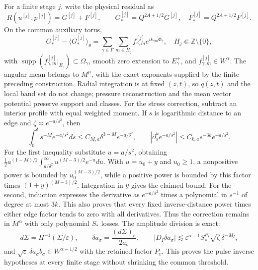 \documentclass[10pt,a4paper]{article}
\begin{document}
For a finite stage $j$, write the physical residual as
\begin{equation}
 R(u^{[j]},p^{[j]})=G^{[j]}+F^{[j]},\qquad
 G_*^{[j]}=Q^{2A+1/2}G^{[j]},\quad F_*^{[j]}=Q^{2A+1/2}F^{[j]} .       \tag{9.3}
\end{equation}
On the common auxiliary torus,
\begin{equation}
 G_*^{[j]}-\langle G_*^{[j]}\rangle_\theta
 =\sum_{\gamma\in\Gamma}\sum_{m\in H_j}f^{[j]}_{\gamma,m}e^{ik_{\gamma m}\Phi_\gamma},
 \quad H_j\Subset\mathbb Z\setminus\{0\},                         \tag{9.4}
\end{equation}
with $\operatorname{supp}(f^{[j]}_{\gamma,m}|_{E_\gamma})\subset\Omega_\gamma$,
smooth zero extension to $E_\gamma^+$, and $f^{[j]}_{\gamma,m}\in W^\alpha$.
The angular mean belongs to $M^\mu$, with the exact exponents supplied by the
finite preceding construction.  Radial integration is at fixed $(z,t)$, so
$q(z,t)$ and the local band set do not change; pressure reconstruction and the
mean vector potential preserve support and classes.  For the stress correction,
subtract an interior profile with equal weighted moment.  If $s$ is logarithmic
distance to an edge and $\zeta\asymp e^{-a/s^2}$, then
\[
\int_0^\delta s^{-M}e^{-a/s^2}ds\le C_{M,a}\delta^{3-M}e^{-a/\delta^2},\qquad
\left|\partial_s^k e^{-a/s^2}\right|\le C_{k,a}s^{-3k}e^{-a/s^2}.
\]
For the first inequality substitute $u=a/s^2$, obtaining
$\frac12a^{(1-M)/2}\int_{a/\delta^2}^\infty
u^{(M-3)/2}e^{-u}du$. With $u=u_0+y$ and $u_0\ge1$, a nonpositive
power is bounded by $u_0^{(M-3)/2}$, while a positive power is bounded
by this factor times $(1+y)^{(M-3)/2}$. Integration in $y$ gives the
claimed bound. For the second, induction expresses the derivative as
$e^{-a/s^2}$ times a polynomial in $s^{-1}$ of degree at most $3k$.
This also proves that every fixed inverse-distance power times either
edge factor tends to zero with all derivatives.
Thus the correction remains in $M^\alpha$ with only polynomial $S_*$ losses.
The amplitude division is exact:
\[
 d\Sigma=H^{-1}(\Sigma/\varepsilon),\qquad
 \delta a_\sigma=\frac{(d\Sigma)_\sigma}{2a_\sigma},\qquad
 |D_I\delta a_\sigma|\lesssim \varepsilon^{\alpha-1}S_*^{P_I}\sqrt\zeta\,\delta^{-M_I},
\]
and $\sqrt\varepsilon\,\delta a_\sigma b_\sigma\in W^{\alpha-1/2}$ with the
retained factor $P_v$. This proves the pulse inverse hypotheses at every finite
stage without shrinking the common threshold.
\end{document}
